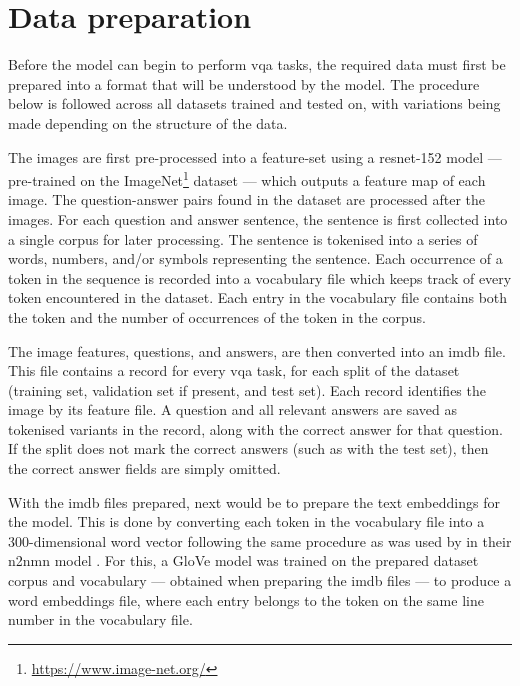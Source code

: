 \section{Data preparation}
\label{sec:data_preparation}

Before the model can begin to perform \gls{vqa} tasks, the required data must first be prepared into a format that will be understood by the model.
The procedure below is followed across all datasets trained and tested on, with variations being made depending on the structure of the data.

The images are first pre-processed into a feature-set using a \acrshort{resnet}-152 model \cite{he_deep_2015} --- pre-trained on the ImageNet\footnote{\url{https://www.image-net.org/}} dataset \cite{deng_imagenet_2009} --- which outputs a feature map of each image.
The question-answer pairs found in the dataset are processed after the images.
For each question and answer sentence, the sentence is first collected into a single \gls{corpus} for later processing.
The sentence is tokenised into a series of words, numbers, and/or symbols representing the sentence.
Each occurrence of a token in the sequence is recorded into a vocabulary file which keeps track of every token encountered in the dataset.
Each entry in the vocabulary file contains both the token and the number of occurrences of the token in the \gls{corpus}.

The image features, questions, and answers, are then converted into an \gls{imdb} file.
This file contains a record for every \acrshort{vqa} task, for each split of the dataset (training set, validation set if present, and test set).
Each record identifies the image by its feature file.
A question and all relevant answers are saved as tokenised variants in the record, along with the correct answer for that question.
If the split does not mark the correct answers (such as with the test set), then the correct answer fields are simply omitted.

With the \gls{imdb} files prepared, next would be to prepare the text embeddings for the model.
This is done by converting each token in the vocabulary file into a 300-dimensional word vector following the same procedure as was used by \citeauthor{hu_learning_2017} in their \gls{n2nmn} model \cite{hu_learning_2017}.
For this, a GloVe model \cite{pennington_glove_2014} was trained on the prepared dataset \gls{corpus} and vocabulary --- obtained when preparing the \gls{imdb} files --- to produce a word embeddings file, where each entry belongs to the token on the same line number in the vocabulary file.


